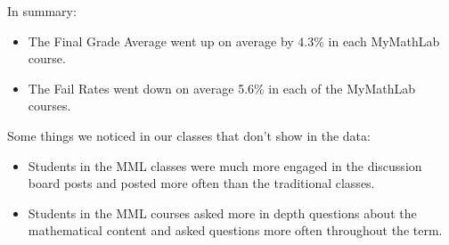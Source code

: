 In summary:
\begin{itemize}
	\item The Final Grade Average went up on average by 4.3\% in each MyMathLab
	course. 
	\item The Fail Rates went down on average 5.6\% in each of the MyMathLab
	courses.
\end{itemize}
Some things we noticed in our classes that don't show in the data:
\begin{itemize}
	\item Students in the MML classes were much more engaged in the discussion
	board posts and posted more often than the traditional classes.
	\item Students in the MML courses asked more in depth questions about the
	mathematical content and asked questions more often throughout the term.
\end{itemize}










